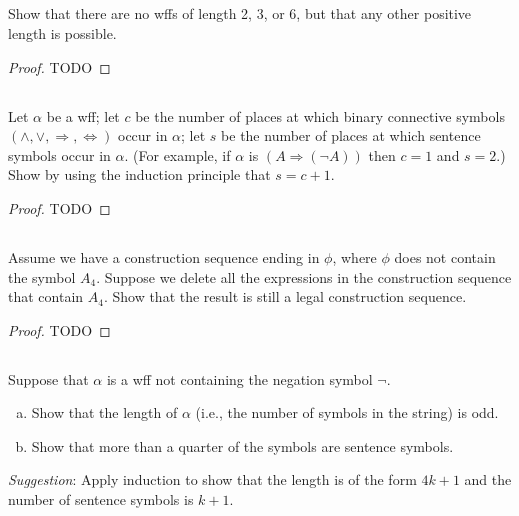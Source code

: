 \documentclass{report}
\begin{document}
\subsection{}%

  Show that there are no wffs of length 2, 3, or 6, but that any other positive
    length is possible.

  \begin{proof}
    TODO
  \end{proof}

\subsection{}%

  Let $\alpha$ be a wff; let $c$ be the number of places at which binary
    connective symbols $(\land, \lor, \Rightarrow, \Leftrightarrow)$ occur in
    $\alpha$; let $s$ be the number of places at which sentence symbols occur in
    $\alpha$.
  (For example, if $\alpha$ is $(A \Rightarrow (\neg A))$ then $c = 1$ and
    $s = 2$.)
  Show by using the induction principle that $s = c + 1$.

  \begin{proof}
    TODO
  \end{proof}

\subsection{}%

  Assume we have a construction sequence ending in $\phi$, where $\phi$ does not
    contain the symbol $A_4$.
  Suppose we delete all the expressions in the construction sequence that
    contain $A_4$.
  Show that the result is still a legal construction sequence.

  \begin{proof}
    TODO
  \end{proof}

\subsection{}%

  Suppose that $\alpha$ is a wff not containing the negation symbol $\neg$.
  \begin{enumerate}[(a)]
    \item Show that the length of $\alpha$ (i.e., the number of symbols in the
      string) is odd.
    \item Show that more than a quarter of the symbols are sentence symbols.
  \end{enumerate}
  \textit{Suggestion}: Apply induction to show that the length is of the form
    $4k + 1$ and the number of sentence symbols is $k + 1$.
\end{document}
